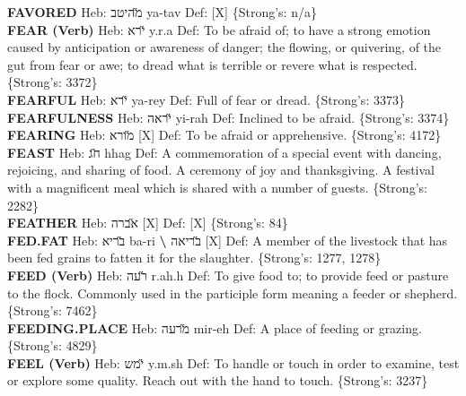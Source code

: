 {\textbf{FAVORED} Heb: {\large\H מהיטב} ya-tav Def: {[}X{]} \{Strong's: n/a\}\hfill{}\\

\textbf{FEAR (Verb)} Heb: {\large\H ירא} y.r.a Def: To be afraid of; to have a strong emotion caused by anticipation or awareness of danger; the flowing, or quivering, of the gut from fear or awe; to dread what is terrible or revere what is respected. \{Strong's: 3372\}\hfill{}\\

\textbf{FEARFUL} Heb: {\large\H ירא} ya-rey Def: Full of fear or dread. \{Strong's: 3373\}\hfill{}\\

\textbf{FEARFULNESS} Heb: {\large\H יראה} yi-rah Def: Inclined to be afraid. \{Strong's: 3374\}\hfill{}\\

\textbf{FEARING} Heb: {\large\H מורא} {[}X{]} Def: To be afraid or apprehensive. \{Strong's: 4172\}\hfill{}\\

\textbf{FEAST} Heb: {\large\H חג} hhag Def: A commemoration of a special event with dancing, rejoicing, and sharing of food. A ceremony of joy and thanksgiving. A festival with a magnificent meal which is shared with a number of guests. \{Strong's: 2282\}\hfill{}\\

\textbf{FEATHER} Heb: {\large\H אברה} {[}X{]} Def: {[}X{]} \{Strong's: 84\}\hfill{}\\

\textbf{FED.FAT} Heb: {\large\H בריא} ba-ri \textbf{\textbackslash{}} {\large\H בריאה} {[}X{]} Def: A member of the livestock that has been fed grains to fatten it for the slaughter. \{Strong's: 1277, 1278\}\hfill{}\\

\textbf{FEED (Verb)} Heb: {\large\H רעה} r.ah.h Def: To give food to; to provide feed or pasture to the flock. Commonly used in the participle form meaning a feeder or shepherd. \{Strong's: 7462\}\hfill{}\\

\textbf{FEEDING.PLACE} Heb: {\large\H מרעה} mir-eh Def: A place of feeding or grazing. \{Strong's: 4829\}\hfill{}\\

\textbf{FEEL (Verb)} Heb: {\large\H ימש} y.m.sh Def: To handle or touch in order to examine, test or explore some quality. Reach out with the hand to touch. \{Strong's: 3237\}\hfill{}\\

}
